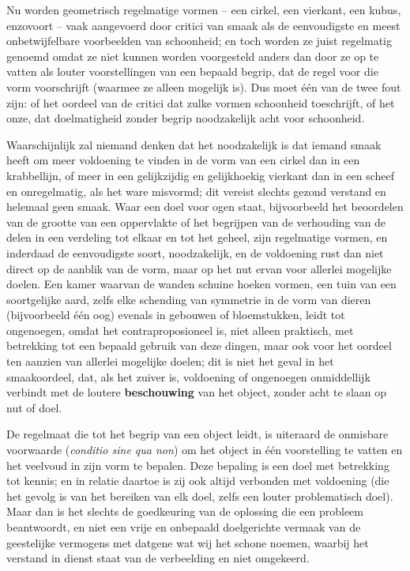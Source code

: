 Nu worden geometrisch regelmatige vormen – een cirkel, een vierkant, een kubus, enzovoort – vaak aangevoerd door critici van smaak als de eenvoudigste en meest onbetwijfelbare voorbeelden van schoonheid; en toch worden ze juist regelmatig genoemd omdat ze niet kunnen worden voorgesteld anders dan door ze op te vatten als louter voorstellingen van een bepaald begrip, dat de regel voor die vorm voorschrijft (waarmee ze alleen mogelijk is). Dus moet één van de twee fout zijn: of het oordeel van de critici dat zulke vormen schoonheid toeschrijft, of het onze, dat doelmatigheid zonder begrip noodzakelijk acht voor schoonheid.

Waarschijnlijk zal niemand denken dat het noodzakelijk is dat iemand smaak heeft om meer voldoening te vinden in de vorm van een cirkel dan in een krabbellijn, of meer in een gelijkzijdig en gelijkhoekig vierkant dan in een scheef en onregelmatig, als het ware misvormd; dit vereist slechts gezond verstand en helemaal geen smaak. Waar een doel voor ogen staat, bijvoorbeeld het beoordelen van de grootte van een oppervlakte of het begrijpen van de verhouding van de delen in een verdeling tot elkaar en tot het geheel, zijn regelmatige vormen, en inderdaad de eenvoudigste soort, noodzakelijk, en de voldoening rust dan niet direct op de aanblik van de vorm, maar op het nut ervan voor allerlei mogelijke doelen. Een kamer waarvan de wanden schuine hoeken vormen, een tuin van een soortgelijke aard, zelfs elke schending van symmetrie in de vorm van dieren (bijvoorbeeld één oog) evenals in gebouwen of bloemstukken, leidt tot ongenoegen, omdat het contraproposioneel is, niet alleen praktisch, met betrekking tot een bepaald gebruik van deze dingen, maar ook voor het oordeel ten aanzien van allerlei mogelijke doelen; dit is niet het geval in het smaakoordeel, dat, als het zuiver is, voldoening of ongenoegen onmiddellijk verbindt met de loutere \textbf{beschouwing} van het object, zonder acht te slaan op nut of doel.

De regelmaat die tot het begrip van een object leidt, is uiteraard de onmisbare voorwaarde (\emph{conditio sine qua non}) om het object in één voorstelling te vatten en het veelvoud in zijn vorm te bepalen. Deze bepaling is een doel met betrekking tot kennis; en in relatie daartoe is zij ook altijd verbonden met voldoening (die het gevolg is van het bereiken van elk doel, zelfs een louter problematisch doel). Maar dan is het slechts de goedkeuring van de oplossing die een probleem beantwoordt, en niet een vrije en onbepaald doelgerichte vermaak van de geestelijke vermogens met datgene wat wij het schone noemen, waarbij het verstand in dienst staat van de verbeelding en niet omgekeerd.

